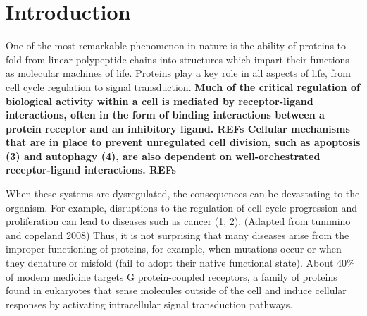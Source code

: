 \chapter{Introduction}



One of the most remarkable phenomenon in nature is the ability of proteins to fold from linear polypeptide chains into structures which impart their functions as molecular machines of life. Proteins play a key role in all aspects of life, from cell cycle regulation to signal transduction. 
\textbf{Much of the critical regulation of biological activity within a cell is mediated by receptor-ligand interactions, often in the form of binding interactions between a protein receptor and an inhibitory ligand. REFs Cellular mechanisms that are in place to prevent unregulated cell division, such as apoptosis (3) and autophagy (4), are also dependent on well-orchestrated receptor-ligand interactions. REFs}

When these systems are dysregulated, the consequences can be devastating to the organism. For example, disruptions to the regulation of cell-cycle progression and proliferation can lead to diseases such as cancer (1, 2). (Adapted from tummino and copeland 2008)
Thus, it is not surprising that many diseases arise from the improper functioning of proteins, for example, when mutations occur or when they denature or misfold (fail to adopt their native functional state). About 40\% of modern medicine targets G protein-coupled receptors, a family of proteins found in eukaryotes that sense molecules outside of the cell and induce cellular responses by activating intracellular signal transduction pathways.

